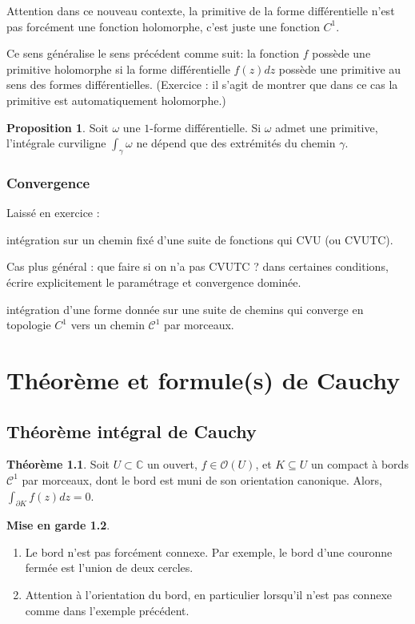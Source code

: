 \documentclass[11pt,a4paper]{book}
\newcommand{\C}{\mathbb{C}}
\theoremstyle{definition}
\newtheorem{theoreme}{Th\'eor\`eme}[section]
\newtheorem{proposition}[theoreme]{Proposition}
\newtheorem{attention}[theoreme]{Mise en garde}
\theoremstyle{plain}
\begin{document}
Attention dans ce nouveau contexte, la primitive de la forme différentielle n'est pas forcément  une fonction holomorphe, c'est juste une fonction $C^1$.

Ce sens généralise le sens précédent comme suit: la fonction $f$ possède une primitive holomorphe si la forme différentielle $f(z)dz$ possède une primitive au sens des formes différentielles. (Exercice : il s'agit de montrer que dans ce cas la primitive est automatiquement holomorphe.)

\begin{proposition}
Soit $\omega$ une $1$-forme différentielle.
Si $\omega$ admet une primitive, l'intégrale curviligne  $\int_\gamma \omega$ ne dépend que des extrémités du chemin $\gamma$.
\end{proposition}


\subsection{Convergence}

Laissé en exercice : 

intégration sur un chemin fixé d'une suite de fonctions qui CVU (ou CVUTC).

Cas plus général : que faire si on n'a pas CVUTC ? dans certaines conditions, écrire explicitement le paramétrage et convergence dominée.

intégration d'une forme donnée sur une suite de chemins qui converge en topologie $C^1$ vers un chemin $\mathcal C^1$ par morceaux.




\chapter{Théorème et formule(s) de Cauchy}

\section{Théorème intégral de Cauchy}

\begin{theoreme}
Soit $U\subset \C$ un ouvert, $f\in \mathcal O(U)$, et $K\subseteq U$ un compact à bords $\mathcal C^1$ par morceaux, dont le bord est muni de son orientation canonique.
Alors, $\int_{\partial K} f(z)dz = 0$.
\end{theoreme}

\begin{attention}
\begin{enumerate}
\item Le bord n'est pas forcément connexe. Par exemple, le bord d'une couronne fermée est l'union de deux cercles.
\item Attention à l'orientation du bord, en particulier lorsqu'il n'est pas connexe comme dans l'exemple précédent.
\end{enumerate}
\end{attention}
\end{document}
